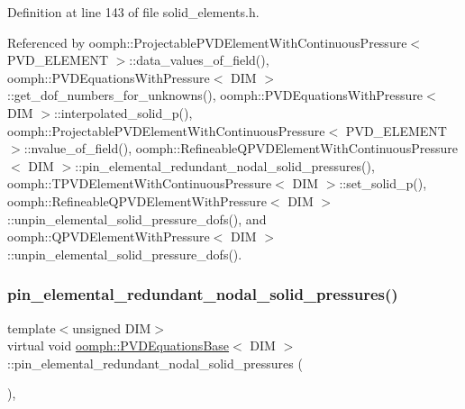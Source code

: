 Definition at line 143 of file solid\+\_\+elements.\+h.



Referenced by oomph\+::\+Projectable\+P\+V\+D\+Element\+With\+Continuous\+Pressure$<$ P\+V\+D\+\_\+\+E\+L\+E\+M\+E\+N\+T $>$\+::data\+\_\+values\+\_\+of\+\_\+field(), oomph\+::\+P\+V\+D\+Equations\+With\+Pressure$<$ D\+I\+M $>$\+::get\+\_\+dof\+\_\+numbers\+\_\+for\+\_\+unknowns(), oomph\+::\+P\+V\+D\+Equations\+With\+Pressure$<$ D\+I\+M $>$\+::interpolated\+\_\+solid\+\_\+p(), oomph\+::\+Projectable\+P\+V\+D\+Element\+With\+Continuous\+Pressure$<$ P\+V\+D\+\_\+\+E\+L\+E\+M\+E\+N\+T $>$\+::nvalue\+\_\+of\+\_\+field(), oomph\+::\+Refineable\+Q\+P\+V\+D\+Element\+With\+Continuous\+Pressure$<$ D\+I\+M $>$\+::pin\+\_\+elemental\+\_\+redundant\+\_\+nodal\+\_\+solid\+\_\+pressures(), oomph\+::\+T\+P\+V\+D\+Element\+With\+Continuous\+Pressure$<$ D\+I\+M $>$\+::set\+\_\+solid\+\_\+p(), oomph\+::\+Refineable\+Q\+P\+V\+D\+Element\+With\+Pressure$<$ D\+I\+M $>$\+::unpin\+\_\+elemental\+\_\+solid\+\_\+pressure\+\_\+dofs(), and oomph\+::\+Q\+P\+V\+D\+Element\+With\+Pressure$<$ D\+I\+M $>$\+::unpin\+\_\+elemental\+\_\+solid\+\_\+pressure\+\_\+dofs().

\mbox{\label{classoomph_1_1PVDEquationsBase_a1e0c99884cc3bad93209bcd19b415fd7}} 
\subsubsection{\texorpdfstring{pin\+\_\+elemental\+\_\+redundant\+\_\+nodal\+\_\+solid\+\_\+pressures()}{pin\_elemental\_redundant\_nodal\_solid\_pressures()}}
{\footnotesize\ttfamily template$<$unsigned D\+IM$>$ \\
virtual void \hyperlink{classoomph_1_1PVDEquationsBase}{oomph\+::\+P\+V\+D\+Equations\+Base}$<$ D\+IM $>$\+::pin\+\_\+elemental\+\_\+redundant\+\_\+nodal\+\_\+solid\+\_\+pressures (\begin{DoxyParamCaption}{ }\end{DoxyParamCaption})\hspace{0.3cm}{\ttfamily [inline]}, {\ttfamily [virtual]}}



